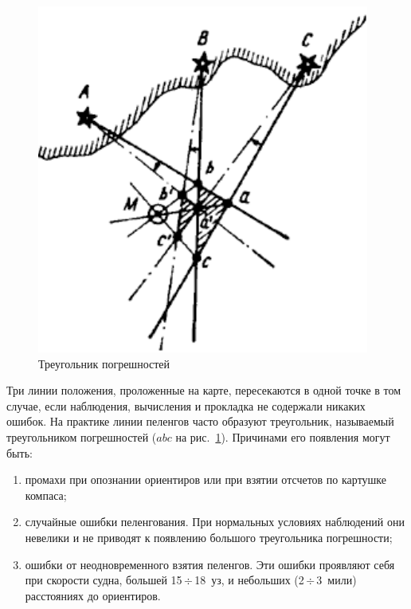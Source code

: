 \documentclass[a4paper, 12pt, twoside, final, book, russian, fittopage, cyremdash]{ncc}
\newcommand{\otdo}{\,\ensuremath{\div}\,}
\newcommand{\ris}[1]{\ref{fig:#1}}
\begin{document}
\begin{figure}[htb]
  \centering{}
  \includegraphics{N042}
  \caption{Треугольник погрешностей}
  \label{fig:N42}
\end{figure}

Три линии положения, проложенные на карте, пересекаются в одной точке в том случае, если наблюдения, вычисления и прокладка не содержали никаких ошибок. На практике линии пеленгов часто образуют треугольник, называемый треугольником погрешностей ($abc$ на рис.~\ris{N42}). Причинами его появления могут быть: 

\begin{enumerate}
\item промахи при опознании ориентиров или при взятии отсчетов по картушке компаса; 
\item случайные ошибки пеленгования. При нормальных условиях наблюдений они невелики и не приводят к появлению большого треугольника погрешности; 
\item ошибки от неодновременного взятия пеленгов. Эти ошибки проявляют себя при скорости судна, большей 15\otdo 18~уз, и небольших (2\otdo 3~мили) расстояниях до ориентиров. 
\end{enumerate}
\end{document}
